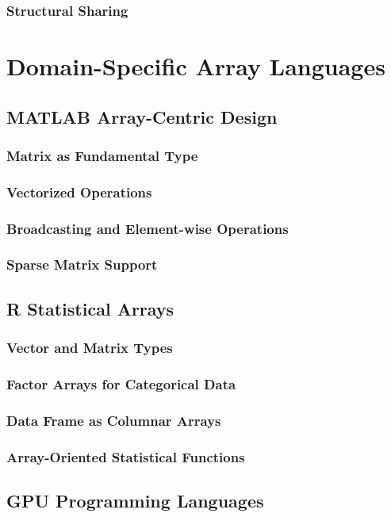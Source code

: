 \documentclass[12pt, oneside]{book}
\begin{document}
\subsubsection{Structural Sharing}

\section{Domain-Specific Array Languages}
\subsection{MATLAB Array-Centric Design}
\subsubsection{Matrix as Fundamental Type}
\subsubsection{Vectorized Operations}
\subsubsection{Broadcasting and Element-wise Operations}
\subsubsection{Sparse Matrix Support}

\subsection{R Statistical Arrays}
\subsubsection{Vector and Matrix Types}
\subsubsection{Factor Arrays for Categorical Data}
\subsubsection{Data Frame as Columnar Arrays}
\subsubsection{Array-Oriented Statistical Functions}

\subsection{GPU Programming Languages}
\end{document}
